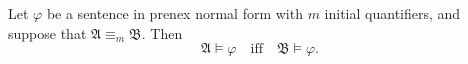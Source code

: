 Let $\varphi$ be a sentence in prenex normal form with $m$ initial quantifiers, and suppose that $\mathfrak{A} \equiv_m \mathfrak{B}$. Then
$$\mathfrak{A} \models \varphi \quad\text{iff}\quad \mathfrak{B} \models \varphi.$$
